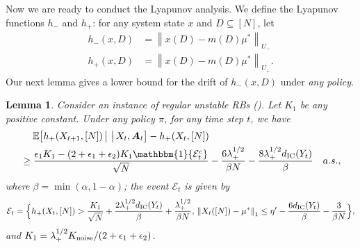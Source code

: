 \documentclass[11pt,letterpaper]{article}
\theoremstyle{plain}
\newtheorem{lemma}{Lemma}
\theoremstyle{definition}
\theoremstyle{remark}
\newcommand{\norm}[1]{\left\lVert#1\right\rVert}
\newcommand{\Ebig}[1]{\mathbb{E}\big[#1\big]}
\newcommand{\givenbig}{\,\big|\,}
\newcommand{\indibrac}[1]{\mathbbm{1}\!\left\{#1\right\}}
\newcommand{\ve}[1]{\bm{#1}}
\newcommand{\veA}{\ve{A}}
\newcommand{\statdist}{\mu^*}
\newcommand{\disy}{d_{\textup{IC}}}
\newcommand{\gapus}{\epsilon_1} %
\newcommand{\gapusmax}{\epsilon_2}
\newcommand{\radiusus}{\eta'}
\newcommand{\noiseortho}{K_{\textup{noise}}}
\newcommand{\subus}{+}%
\newcommand{\subst}{-}%
\newcommand{\Uus}{U_{\subus}}
\newcommand{\Ust}{U_{\subst}}
\newcommand{\hus}{h_{\subus}}
\newcommand{\hst}{h_{\subst}}
\newcommand{\lamus}{\lambda_{\subus}}
\newcommand{\goodevent}{\mathcal{E}}
\begin{document}
Now we are ready to conduct the Lyapunov analysis. 
We define the Lyapunov functions $\hst$ and $\hus$: for any system state $x$ and $D\subseteq[N]$, let
\begin{align}
    \hst(x, D) &=  \norm{x(D) - m(D)\statdist}_{\Ust}  \\
     \hus(x, D) &=  \norm{x(D) - m(D)\statdist}_{\Uus}.
\end{align}
Our next lemma gives a lower bound for the drift of $\hst(x, D)$ under \emph{any policy}. 

\begin{lemma}
    \label{lem:hus-drift}
    Consider an instance of regular unstable RBs (). Let $K_1$ be any positive constant. Under any policy $\pi$, for any time step $t$, we have
    \begin{align}
        \nonumber
          &\mspace{23mu} \Ebig{\hus(X_{t+1}, [N]) \givenbig \givenbig X_t, \veA_t} - \hus(X_t, [N])\\
          &\geq 
         \frac{\gapus K_1- (2+\gapus + \gapusmax) K_1 \indibrac{\goodevent_t^c}}{\sqrt{N}} - \frac{6\lamus^{1/2}}{\beta N} -  \frac{8 \lamus^{1/2} \disy(Y_t)}{\beta} \quad a.s., 
    \end{align}
    where $\beta = \min(\alpha, 1-\alpha)$; the event $\goodevent_t$ is given by 
    \[
        \goodevent_t = \Big\{\hus(X_t, [N]) > \frac{K_1}{\sqrt{N}} + \frac{2\lamus^{1/2} \disy(Y_t)}{\beta} + \frac{\lamus^{1/2}}{\beta N}, \, \norm{X_t([N]) - \statdist}_1 \leq \radiusus -  \frac{6\disy(Y_t)}{\beta} - \frac{3}{\beta N}\Big\},
    \]
    and $K_1 = \lamus^{1/2} \noiseortho / (2+\gapus+\gapusmax)$. 
\end{lemma}
\end{document}
